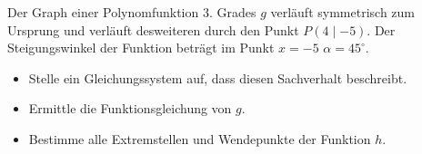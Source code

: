 
Der Graph einer Polynomfunktion 3. Grades $g$ verläuft symmetrisch zum Ursprung und
verläuft desweiteren durch den Punkt $P(4\mid-5)$. Der Steigungswinkel der Funktion
beträgt im Punkt $x=-5$ $\alpha=45^\circ$.

\begin{itemize}
	\item Stelle ein Gleichungssystem auf, dass diesen Sachverhalt beschreibt.
	\item Ermittle die Funktionsgleichung von $g$.
	\item Bestimme alle Extremstellen und Wendepunkte der Funktion $h$.
\end{itemize}
